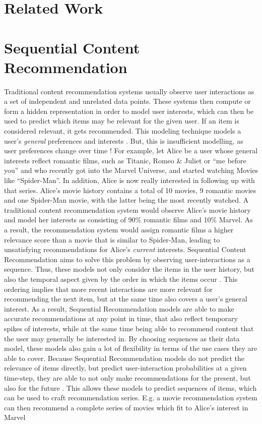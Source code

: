 \documentclass{Academic}
\begin{document}
    \section{Related Work}

    \section{Sequential Content Recommendation}\label{sec:seq_recom}
    Traditional content recommendation systems usually observe user interactions as a set of independent and unrelated data points. These systems then compute or form a hidden representation in order to model user interests, which can then be used to predict which items may be relevant for the given user. If an item is considered relevant, it gets recommended. This modeling technique models a user's \textit{general} preferences and interests \cite{wangSequentialRecommenderSystems2019}. But, this is insufficient modelling, as user preferences change over time \cite{wangSequentialRecommenderSystems2019}! For example, let Alice be a user whose general interests reflect romantic films, such as Titanic, Romeo \& Juliet or \enquote{me before you} and who recently got into the Marvel Universe, and started watching Movies like \enquote{Spider-Man}. In addition, Alice is now really interested in following up with that series. Alice's movie history contains a total of 10 movies, 9 romantic movies and one Spider-Man movie, with the latter being the most recently watched. A traditional content recommendation system would observe Alice's movie history and model her interests as consisting of 90\% romantic films and 10\% Marvel. As a result, the recommendation system would assign romantic films a higher relevance score than a movie that is similar to Spider-Man, leading to unsatisfying recommendations for Alice's \textit{current} interests. Sequential Content Recommendation aims to solve this problem by observing user-interactions as a sequence. Thus, these models not only consider the items in the user history, but also the temporal aspect given by the order in which the items occur \cite{wangSequentialRecommenderSystems2019}. This ordering implies that more recent interactions are more relevant for recommending the next item, but at the same time also covers a user's general interest. As a result, Sequential Recommendation models are able to make accurate recommendations at any point in time, that also reflect temporary spikes of interests, while at the same time being able to recommend content that the user may generally be interested in. By choosing sequences as their data model, these models also gain a lot of flexibility in terms of the use cases they are able to cover. Because Sequential Recommendation models do not predict the relevance of items directly, but predict user-interaction probabilities at a given time-step, they are able to not only make recommendations for the present, but also for the future \cite{wangSequentialRecommenderSystems2019}. This allows these models to predict sequences of items, which can be used to craft recommendation series. E.g. a movie recommendation system can then recommend a complete series of movies which fit to Alice's interest in Marvel 
\end{document}
